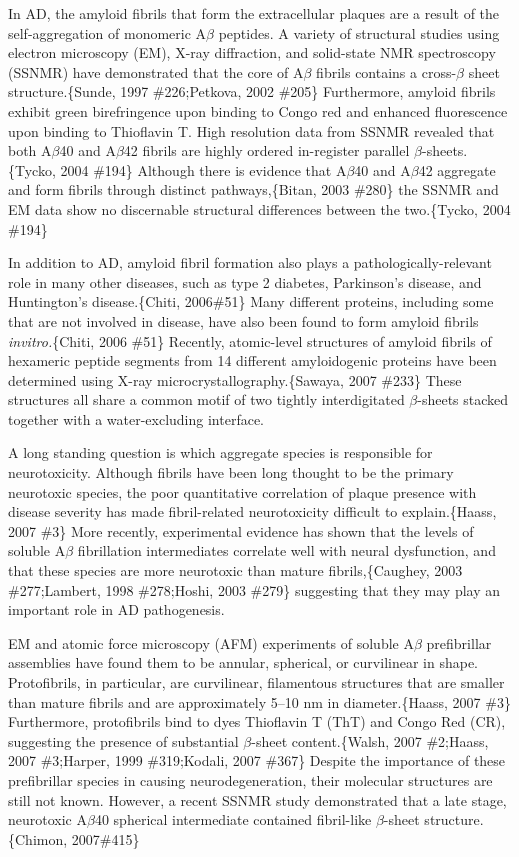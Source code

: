 In AD, the amyloid fibrils that form the extracellular plaques are a result of the self-aggregation of monomeric A$\beta$ peptides. A variety of structural studies using electron microscopy (EM), X-ray diffraction, and solid-state NMR spectroscopy (SSNMR) have demonstrated that the core of A$\beta$ fibrils contains a cross-$\beta$ sheet structure.\{Sunde, 1997 \#226;Petkova, 2002 \#205\} Furthermore, amyloid fibrils exhibit green birefringence upon binding to Congo red and enhanced fluorescence upon binding to Thioflavin T. High resolution data from SSNMR revealed that both A$\beta$40 and A$\beta$42 fibrils are highly ordered in-register parallel $\beta$-sheets.\{Tycko, 2004 \#194\} Although there is evidence that A$\beta$40 and A$\beta$42 aggregate and form fibrils through distinct pathways,\{Bitan, 2003 \#280\} the SSNMR and EM data show no discernable structural differences between the two.\{Tycko, 2004 \#194\}

In addition to AD, amyloid fibril formation also plays a pathologically-relevant role in many other diseases, such as type 2 diabetes, Parkinson's disease, and Huntington's disease.\{Chiti, 2006\#51\} Many different proteins, including some that are not involved in
disease, have also been found to form amyloid fibrils \emph{invitro.}\{Chiti, 2006 \#51\} Recently, atomic-level structures of amyloid
fibrils of hexameric peptide segments from 14 different amyloidogenic proteins have been determined using X-ray microcrystallography.\{Sawaya, 2007 \#233\} These structures all share a common motif of two tightly interdigitated $\beta$-sheets stacked together with a water-excluding interface.

A long standing question is which aggregate species is responsible for neurotoxicity. Although fibrils have been long thought to be the primary neurotoxic species, the poor quantitative correlation of plaque presence with disease severity has made fibril-related neurotoxicity difficult to explain.\{Haass, 2007 \#3\} More recently, experimental evidence has shown that the levels of soluble A$\beta$ fibrillation intermediates correlate well with neural dysfunction, and that these species are more neurotoxic than mature fibrils,\{Caughey, 2003 \#277;Lambert, 1998 \#278;Hoshi, 2003 \#279\} suggesting that they may play an important role in AD pathogenesis.

EM and atomic force microscopy (AFM) experiments of soluble A$\beta$ prefibrillar assemblies have found them to be annular, spherical, or curvilinear in shape. Protofibrils, in particular, are curvilinear, filamentous structures that are smaller than mature fibrils and are approximately 5--10 nm in diameter.\{Haass, 2007 \#3\} Furthermore, protofibrils bind to dyes Thioflavin T (ThT) and Congo Red (CR), suggesting the presence of substantial $\beta$-sheet content.\{Walsh, 2007 \#2;Haass, 2007 \#3;Harper, 1999 \#319;Kodali, 2007 \#367\} Despite the importance of these prefibrillar species in causing neurodegeneration, their molecular structures are still not known. However, a recent SSNMR study demonstrated that a late stage, neurotoxic A$\beta$40 spherical intermediate contained fibril-like $\beta$-sheet structure.\{Chimon, 2007\#415\}


